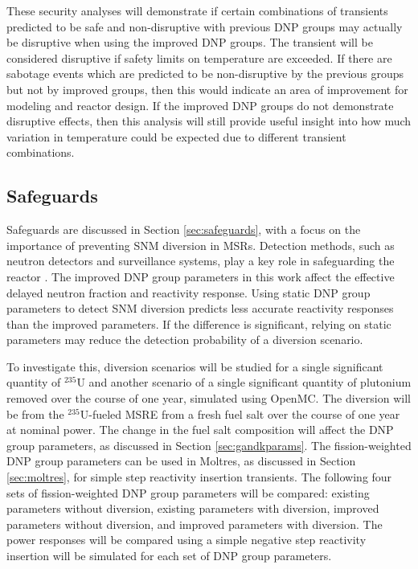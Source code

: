 These security analyses will demonstrate if certain combinations of transients predicted to be safe and non-disruptive with previous \gls{DNP} groups may actually be disruptive when using the improved \gls{DNP} groups.
The transient will be considered disruptive if safety limits on temperature are exceeded.
If there are sabotage events which are predicted to be non-disruptive by the previous groups but not by improved groups, then this would indicate an area of improvement for modeling and reactor design.
If the improved \gls{DNP} groups do not demonstrate disruptive effects, then this analysis will still provide useful insight into how much variation in temperature could be expected due to different transient combinations.

\subsection{Safeguards}
\label{sec:safeguards-trans}
Safeguards are discussed in Section \ref{sec:safeguards}, with a focus on the importance of preventing \gls{SNM} diversion in \glspl{MSR}.
Detection methods, such as neutron detectors and surveillance systems, play a key role in safeguarding the reactor \cite{zubair2024nuclear}.
The improved \gls{DNP} group parameters in this work affect the effective delayed neutron fraction and reactivity response.
Using static \gls{DNP} group parameters to detect \gls{SNM} diversion predicts less accurate reactivity responses than the improved parameters.
If the difference is significant, relying on static parameters may reduce the detection probability of a diversion scenario.

To investigate this, diversion scenarios will be studied for a single significant quantity of $^{235}$U and another scenario of a single significant quantity of plutonium removed over the course of one year, simulated using OpenMC.
The diversion will be from the $^{235}$U-fueled \gls{MSRE} from a fresh fuel salt over the course of one year at nominal power. 
The change in the fuel salt composition will affect the \gls{DNP} group parameters, as discussed in Section \ref{sec:gandkparams}.
The fission-weighted \gls{DNP} group parameters can be used in Moltres, as discussed in Section \ref{sec:moltres}, for simple step reactivity insertion transients.
The following four sets of fission-weighted \gls{DNP} group parameters will be compared: existing parameters without diversion, existing parameters with diversion, improved parameters without diversion, and improved parameters with diversion.
The power responses will be compared using a simple negative step reactivity insertion will be simulated for each set of \gls{DNP} group parameters.

